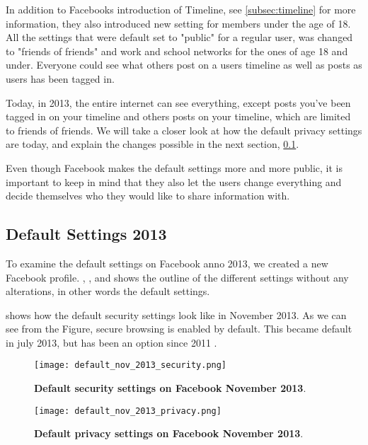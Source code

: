 In addition to Facebooks introduction of Timeline, see \ref{subsec:timeline} for more information, they also introduced new setting for members under the age of 18. All the settings that were default set to "public" for a regular user, was changed to "friends of friends" and work and school networks for the ones of age 18 and under. Everyone could see what others post on a users timeline as well as posts as users has been tagged in.

Today, in 2013, the entire internet can see everything,  except posts you've been tagged in on your timeline and others posts on your timeline, which are limited to friends of friends. We will take a closer look at how the default privacy settings are today, and explain the changes possible in the next section, \ref{subsec:default2013}. 

Even though Facebook makes the default settings more and more public, it is important to keep in mind that they also let the users change everything and decide themselves who they would like to share information with.   


\subsection{Default Settings 2013}
\label{subsec:default2013}

To examine the default settings on Facebook anno 2013, we created a new Facebook profile. , ,  and  shows the outline of the different settings without any alterations, in other words the default settings. 

 shows how the default security settings look like in November 2013. As we can see from the Figure, secure browsing is enabled by default. This became default in july 2013, but has been an option since 2011 \cite{secureBrowsing}. 

\begin{figure}[h!]
\centering
\texttt{[image: default\_nov\_2013\_security.png]}
\caption[Default security settings on Facebook November 2013]{\textbf{Default security settings on Facebook November 2013}.} 
\label{fig:security2013}
\end{figure}

\begin{figure}[h!]
\centering
\texttt{[image: default\_nov\_2013\_privacy.png]}
\caption[Default privacy settings on Facebook November 2013]{\textbf{Default privacy settings on Facebook November 2013}.} 
\label{fig:privacy2013}
\end{figure}

